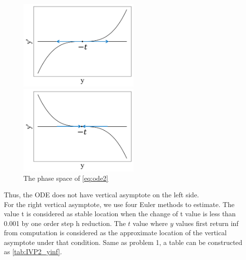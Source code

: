 \documentclass[a4paper]{article}
\begin{document}
    \begin{figure}[H]
       \subfigure 
    {
    	\begin{minipage}{9cm}
    	 \centering      
    		\includegraphics[width=6cm]{img/ivp2_phase_graph_1.png}
    	\end{minipage}
    }
      \subfigure 
    {
    	\begin{minipage}{7cm}
    	\centering      
    		\includegraphics[width=6cm]{img/ivp2_phase_graph_2.png}
    	\end{minipage}
    }
    \caption{\label{fig:ivp2_phase} The phase space of \autoref{eq:ode2}} 
    \end{figure}
    
    Thus, the ODE does not have vertical asymptote on the left side. \\

    For the right vertical asymptote, we use four Euler methods to estimate. The value t is considered as stable location when the change of t value is less than 0.001 by one order step h reduction. The $t$ value where $y$ values first return inf from computation is considered as the approximate location of the vertical asymptote under that condition. Same as problem 1, a table can be constructed as \autoref{tab:IVP2_yinf}.
    
\end{document}
